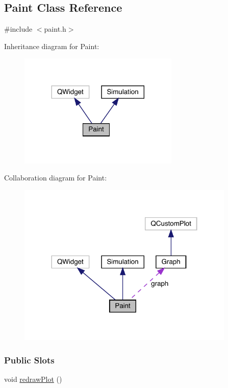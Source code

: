 \hypertarget{classPaint}{}\subsection{Paint Class Reference}
\label{classPaint}


{\ttfamily \#include $<$paint.\+h$>$}



Inheritance diagram for Paint\+:\nopagebreak
\begin{figure}[H]
\begin{center}
\leavevmode
\includegraphics[width=216pt]{classPaint__inherit__graph}
\end{center}
\end{figure}


Collaboration diagram for Paint\+:\nopagebreak
\begin{figure}[H]
\begin{center}
\leavevmode
\includegraphics[width=293pt]{classPaint__coll__graph}
\end{center}
\end{figure}
\subsubsection*{Public Slots}
\begin{DoxyCompactItemize}
\item 
void \mbox{\hyperlink{classPaint_a9790e137dfd6386ed72aea47f176326d}{redraw\+Plot}} ()
\end{DoxyCompactItemize}
